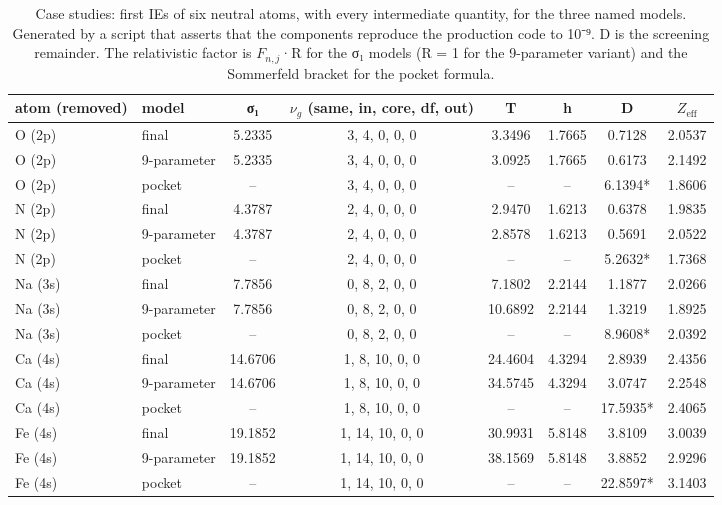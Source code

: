 \documentclass[aps,pra,preprint,notitlepage,superscriptaddress,amsmath,amssymb]{revtex4-2}
\begin{document}
\begin{table}[htbp]
\caption{Case studies: first IEs of six neutral atoms, with every intermediate quantity, for the three named models. Generated by a script that asserts that the components reproduce the production code to 10⁻⁹. D is the screening remainder. The relativistic factor is $F_{n,j}$·R for the σ₁ models (R = 1 for the 9-parameter variant) and the Sommerfeld bracket for the pocket formula.}
\scriptsize\linespread{1}\selectfont\setlength{\tabcolsep}{5pt}\renewcommand{\arraystretch}{1.1}
\begin{adjustbox}{max width=\linewidth}
\begin{tabular}{llcccccc}
\hline\hline
atom (removed) & model & σ₁ & $ν_{g}$ (same, in, core, df, out) & T & h & D & $Z_{\mathrm{eff}}$ \\
\hline
O (2p) & final & 5.2335 & 3, 4, 0, 0, 0 & 3.3496 & 1.7665 & 0.7128 & 2.0537 \\
O (2p) & 9-parameter & 5.2335 & 3, 4, 0, 0, 0 & 3.0925 & 1.7665 & 0.6173 & 2.1492 \\
O (2p) & pocket & – & 3, 4, 0, 0, 0 & – & – & 6.1394* & 1.8606 \\
N (2p) & final & 4.3787 & 2, 4, 0, 0, 0 & 2.9470 & 1.6213 & 0.6378 & 1.9835 \\
N (2p) & 9-parameter & 4.3787 & 2, 4, 0, 0, 0 & 2.8578 & 1.6213 & 0.5691 & 2.0522 \\
N (2p) & pocket & – & 2, 4, 0, 0, 0 & – & – & 5.2632* & 1.7368 \\
Na (3s) & final & 7.7856 & 0, 8, 2, 0, 0 & 7.1802 & 2.2144 & 1.1877 & 2.0266 \\
Na (3s) & 9-parameter & 7.7856 & 0, 8, 2, 0, 0 & 10.6892 & 2.2144 & 1.3219 & 1.8925 \\
Na (3s) & pocket & – & 0, 8, 2, 0, 0 & – & – & 8.9608* & 2.0392 \\
Ca (4s) & final & 14.6706 & 1, 8, 10, 0, 0 & 24.4604 & 4.3294 & 2.8939 & 2.4356 \\
Ca (4s) & 9-parameter & 14.6706 & 1, 8, 10, 0, 0 & 34.5745 & 4.3294 & 3.0747 & 2.2548 \\
Ca (4s) & pocket & – & 1, 8, 10, 0, 0 & – & – & 17.5935* & 2.4065 \\
Fe (4s) & final & 19.1852 & 1, 14, 10, 0, 0 & 30.9931 & 5.8148 & 3.8109 & 3.0039 \\
Fe (4s) & 9-parameter & 19.1852 & 1, 14, 10, 0, 0 & 38.1569 & 5.8148 & 3.8852 & 2.9296 \\
Fe (4s) & pocket & – & 1, 14, 10, 0, 0 & – & – & 22.8597* & 3.1403 \\

\end{tabular}
\end{adjustbox}
\end{table}
\end{document}
